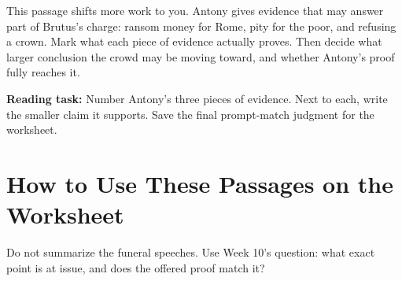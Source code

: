 \documentclass[12pt]{article}
\begin{document}
This passage shifts more work to you. Antony gives evidence that may answer part of Brutus's charge: ransom money for Rome, pity for the poor, and refusing a crown. Mark what each piece of evidence actually proves. Then decide what larger conclusion the crowd may be moving toward, and whether Antony's proof fully reaches it.

\textbf{Reading task:} Number Antony's three pieces of evidence. Next to each, write the smaller claim it supports. Save the final prompt-match judgment for the worksheet.

\section*{How to Use These Passages on the Worksheet}

Do not summarize the funeral speeches. Use Week 10's question: what exact point is at issue, and does the offered proof match it?
\end{document}

